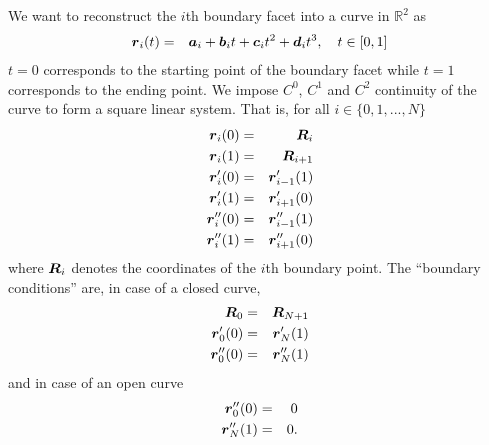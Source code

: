 We want to reconstruct the $i$th boundary facet into a curve in $\mathbb{R}^2$ as
\begin{eqnarray}
\boldsymbol{r}_i(t) &=& \boldsymbol{a}_i + \boldsymbol{b}_i t + \boldsymbol{c}_it^2 + \boldsymbol{d}_it^3, \quad t \in [0,1]
\end{eqnarray}
$t=0$ corresponds to the starting point of the boundary facet while $t=1$ corresponds to the ending point. We impose $C^0$, $C^1$ and $C^2$ continuity of the curve to form a square linear system. That is, for all $i \in \{0,1,...,N\}$
\begin{eqnarray}
\boldsymbol{r}_i(0) &=& \boldsymbol{R}_i \\
\boldsymbol{r}_i(1) &=& \boldsymbol{R}_{i+1} \\
\boldsymbol{r}_i'(0) &=& \boldsymbol{r}_{i-1}'(1) \\
\boldsymbol{r}_i'(1) &=& \boldsymbol{r}_{i+1}'(0) \\
\boldsymbol{r}_i''(0) &=& \boldsymbol{r}_{i-1}''(1) \\
\boldsymbol{r}_i''(1) &=& \boldsymbol{r}_{i+1}''(0)
\end{eqnarray}
where $\boldsymbol{R}_i$ denotes the coordinates of the $i$th boundary point. The ``boundary conditions'' are, in case of a closed curve,
\begin{eqnarray}
\boldsymbol{R}_0 &=& \boldsymbol{R}_{N+1} \\
\boldsymbol{r}_0'(0) &=& \boldsymbol{r}_N'(1) \\
\boldsymbol{r}_0''(0) &=& \boldsymbol{r}_N''(1)
\end{eqnarray}
and in case of an open curve
\begin{eqnarray}
\boldsymbol{r}_0''(0) &=& 0 \\
\boldsymbol{r}_N''(1) &=& 0.
\end{eqnarray}

